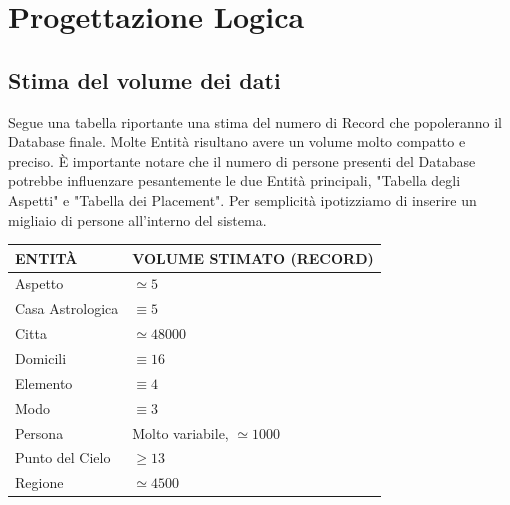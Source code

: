 \chapter{Progettazione Logica}
\section{Stima del volume dei dati}
Segue una tabella riportante una stima del numero di Record che popoleranno il Database finale. Molte Entità risultano avere un volume molto compatto e preciso.\newline
È importante notare che il numero di persone presenti del Database potrebbe influenzare pesantemente le due Entità principali, "Tabella degli Aspetti" e "Tabella dei Placement". Per semplicità ipotizziamo di inserire un migliaio di persone all'interno del sistema.
{
\begin{longtable}{ |p{4cm}|p{6cm}|  }
\endfoot
\hline
\textbf{ENTITÀ} & \textbf{VOLUME STIMATO (RECORD)} \\
\hline
Aspetto & \begin{math} \simeq 5 \end{math} \\
Casa Astrologica & \begin{math} \equiv 5 \end{math} \\
Citta & \begin{math} \simeq 48000 \end{math} \\
Domicili & \begin{math} \equiv 16 \end{math} \\
Elemento & \begin{math} \equiv 4 \end{math}\\
Modo & \begin{math} \equiv 3 \end{math} \\
Persona & Molto variabile, \begin{math} \simeq 1000 \end{math} \\
Punto del Cielo & \begin{math} \geq 13 \end{math} \\
Regione & \begin{math} \simeq 4500 \end{math} \\

\end{longtable}}
